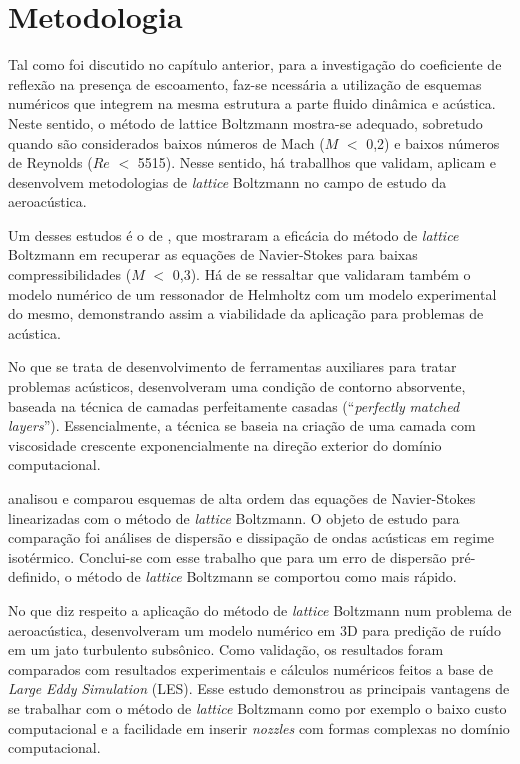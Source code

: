 \chapter{Metodologia}

Tal como foi discutido no capítulo anterior, para a investigação do coeficiente de reflexão na presença de escoamento, faz-se ncessária a utilização de esquemas numéricos que integrem na mesma estrutura a parte fluido dinâmica e acústica. Neste sentido, o método de lattice Boltzmann mostra-se adequado, sobretudo quando são considerados baixos números de Mach ($M$ $<$ 0,2) e baixos números de Reynolds ($Re$ $<$ 5515). Nesse sentido, há traballhos que validam, aplicam e desenvolvem metodologias de \textit{lattice} Boltzmann no campo de estudo da aeroacústica.

Um desses estudos é o de , que mostraram a eficácia do método de \textit{lattice} Boltzmann em recuperar as equações de Navier-Stokes para baixas compressibilidades ($M$ $<$ 0,3). Há de se ressaltar que validaram também o modelo numérico de um ressonador de Helmholtz com um modelo experimental do mesmo, demonstrando assim a viabilidade da aplicação para problemas de acústica.

No que se trata de desenvolvimento de ferramentas auxiliares para tratar problemas acústicos,  desenvolveram uma condição de contorno absorvente, baseada na técnica de camadas perfeitamente casadas (``\textit{perfectly} \textit{matched} \textit{layers}''). Essencialmente, a técnica se baseia na criação de uma camada com viscosidade crescente exponencialmente na direção exterior do domínio computacional.

 analisou e comparou esquemas de alta ordem das equações de Navier-Stokes linearizadas com o método de \textit{lattice} Boltzmann. O objeto de estudo para comparação foi análises de dispersão e dissipação de ondas acústicas em regime isotérmico. Conclui-se com esse trabalho que para um erro de dispersão pré-definido, o método de \textit{lattice} Boltzmann se comportou como mais rápido.

No que diz respeito a aplicação do método de \textit{lattice} Boltzmann num problema de aeroacústica,  desenvolveram um modelo numérico em 3D para predição de ruído em um jato turbulento subsônico. Como validação, os resultados foram comparados com resultados experimentais e cálculos numéricos feitos a base de \textit{Large} \textit{Eddy} \textit{Simulation} (LES). Esse estudo demonstrou as principais vantagens de se trabalhar com o método de \textit{lattice} Boltzmann como por exemplo o baixo custo computacional e a facilidade em inserir \textit{nozzles} com formas complexas no domínio computacional.


